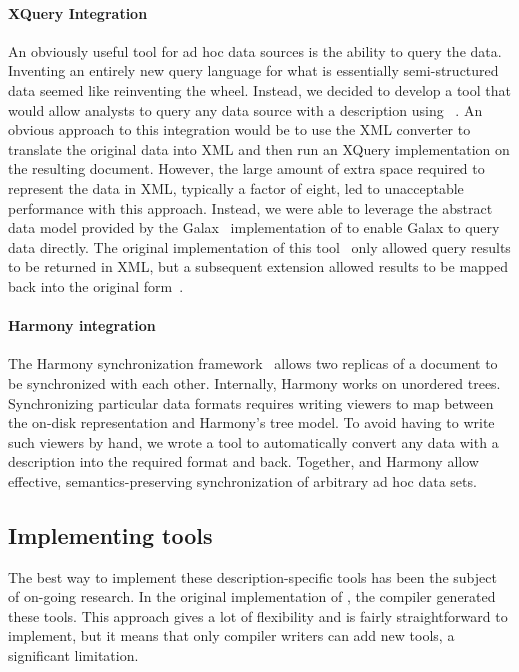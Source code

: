 \documentclass{sig-alternate}
\begin{document}
\paragraph{XQuery Integration}
An obviously useful tool for ad hoc data sources is the ability to
query the data.  Inventing an entirely new query language for what is
essentially semi-structured data seemed like reinventing the wheel.
Instead, we decided to develop a tool that would allow analysts to
query any data source with a \pads{} description using
\xquery{}~\cite{xquery}.  An obvious approach to this integration
would be to use the XML converter to translate the original data into
XML and then run an XQuery implementation on the resulting document.
However, the large amount of extra space required to represent the
data in XML, typically a factor of eight, led to unacceptable
performance with this approach.  Instead, we were able to leverage the
abstract data model provided by the Galax~\cite{galax} implementation
of \xquery{} to enable Galax to query \pads{} data directly.  The
original implementation of this tool~\cite{fernandez+:padx} only
allowed query results to be returned in XML, but a subsequent extension
allowed results to be mapped back into the original
form~\cite{fernandez+:padl}. 

\paragraph{Harmony integration}
The Harmony synchronization framework~\cite{harmony-web} allows
two replicas of a document to be synchronized with each other.
Internally, Harmony works on unordered trees.  Synchronizing
particular data formats requires writing viewers to map between the
on-disk representation and Harmony's tree model.  To avoid having to
write such viewers by hand, we wrote a tool to automatically convert
any data with a \pads{} description into the required format and
back. Together, \pads{} and Harmony allow effective, semantics-preserving synchronization of arbitrary ad hoc data sets.

\subsection{Implementing tools}
The best way to implement these description-specific tools has been
the subject of on-going research.  In the original implementation of
\pads{}, the compiler generated these tools.  This approach gives a
lot of flexibility and is fairly straightforward to implement, but it
means that only compiler writers can add new tools, a significant
limitation.  
\end{document}
